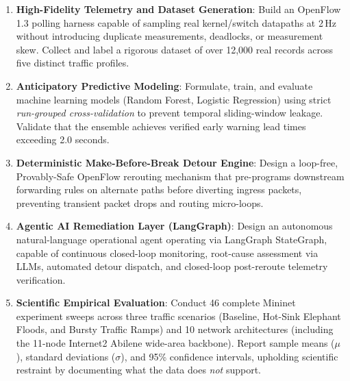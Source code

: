 \begin{enumerate}[label=\textbf{RO\arabic*.}]
  \item \textbf{High-Fidelity Telemetry and Dataset Generation}: Build an OpenFlow 1.3 polling harness capable of sampling real kernel/switch datapaths at 2\,Hz without introducing duplicate measurements, deadlocks, or measurement skew. Collect and label a rigorous dataset of over 12,000 real records across five distinct traffic profiles.
  \item \textbf{Anticipatory Predictive Modeling}: Formulate, train, and evaluate machine learning models (Random Forest, Logistic Regression) using strict \textit{run-grouped cross-validation} to prevent temporal sliding-window leakage. Validate that the ensemble achieves verified early warning lead times exceeding 2.0 seconds.
  \item \textbf{Deterministic Make-Before-Break Detour Engine}: Design a loop-free, Provably-Safe OpenFlow rerouting mechanism that pre-programs downstream forwarding rules on alternate paths before diverting ingress packets, preventing transient packet drops and routing micro-loops.
  \item \textbf{Agentic AI Remediation Layer (LangGraph)}: Design an autonomous natural-language operational agent operating via LangGraph StateGraph, capable of continuous closed-loop monitoring, root-cause assessment via LLMs, automated detour dispatch, and closed-loop post-reroute telemetry verification.
  \item \textbf{Scientific Empirical Evaluation}: Conduct 46 complete Mininet experiment sweeps across three traffic scenarios (Baseline, Hot-Sink Elephant Floods, and Bursty Traffic Ramps) and 10 network architectures (including the 11-node Internet2 Abilene wide-area backbone). Report sample means ($\mu$), standard deviations ($\sigma$), and 95\% confidence intervals, upholding scientific restraint by documenting what the data does \textit{not} support.
\end{enumerate}

